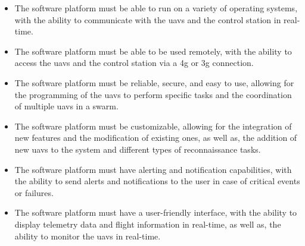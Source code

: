 \begin{itemize}
  \item The software platform must be able to run on a variety of operating systems, with the ability to communicate with the \glspl{uav} and the control station in real-time.

  \item The software platform must be able to be used remotely, with the ability to access the \glspl{uav} and the control station via a \gls{4g} or \gls{3g} connection.

  \item The software platform must be reliable, secure, and easy to use, allowing for the programming of the \glspl{uav} to perform specific tasks and the coordination of multiple \glspl{uav} in a swarm.

  \item The software platform must be customizable, allowing for the integration of new features and the modification of existing ones, as well as, the addition of new \glspl{uav} to the system and different types of reconnaissance tasks.

  \item The software platform must have alerting and notification capabilities, with the ability to send alerts and notifications to the user in case of critical events or failures.

  \item The software platform must have a user-friendly interface, with the ability to display telemetry data and flight information in real-time, as well as, the ability to monitor the \glspl{uav} in real-time.
\end{itemize}

